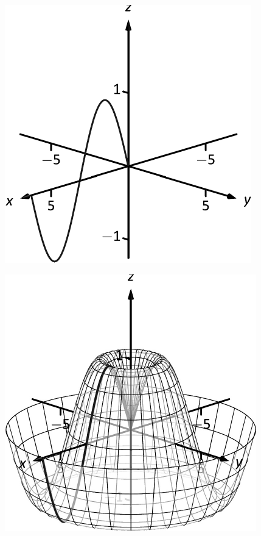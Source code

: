 \documentclass[10pt]{article}
\begin{document}
\includegraphics{figsurfrev2a_3DBW.pdf}
\texttt{}

\includegraphics{figsurfrev2b_3DBW.pdf}
\texttt{}
\end{document}
